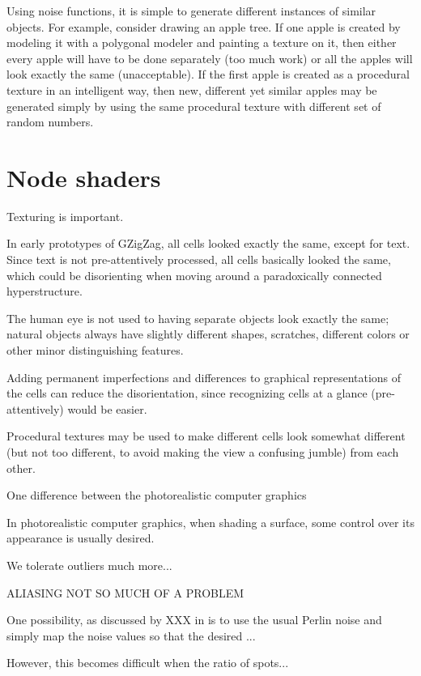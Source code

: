 \documentclass[twocolumn]{IV02}
\begin{document}
Using noise functions,
it is simple to generate different instances of similar objects.
For example, consider drawing an apple tree. If one apple is created by
modeling it with a polygonal modeler and painting a texture on it, 
then either every apple will have to be done separately (too much
work) or all the apples will look exactly the same (unacceptable).
If the first apple is created as a procedural texture in an intelligent
way, then new, different yet similar apples may be generated simply
by using the same procedural texture with different 
set of random numbers.


\section{Node shaders}

Texturing is important\cite{haeberli93texture}.

In early prototypes of GZigZag, all cells looked exactly the same,
except for text. Since text is not pre-attentively processed,
all cells basically looked the same, which could be disorienting when moving
around a paradoxically connected hyperstructure.

The human eye is not used to having separate objects look exactly the same; 
natural objects always have slightly different shapes, scratches, different
colors or other minor distinguishing features.

Adding permanent imperfections and differences to graphical representations
of the cells can reduce the disorientation, since recognizing
cells at a glance (pre-attentively) would be easier.

Procedural textures may be used to make different cells look somewhat
different (but not too different, to avoid making the view a confusing jumble)
from each other.

One difference between the  photorealistic computer graphics 

In photorealistic computer graphics, when shading a surface, some control
over its appearance is usually desired. 

We tolerate outliers much more...

ALIASING NOT SO MUCH OF A PROBLEM

One possibility, as discussed by XXX in \cite{texturing-and-modeling}
is to use the usual Perlin noise and simply map the noise values so that
the desired ...

However, this becomes difficult when the ratio of spots...
\end{document}
